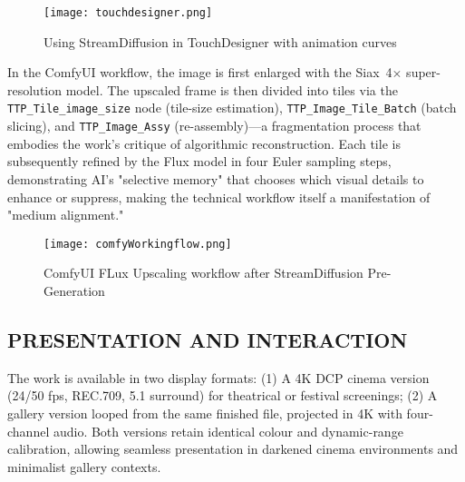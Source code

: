 \documentclass[sigconf]{acmart} %
\begin{document}
\begin{figure}[H]
    \centering
    \texttt{[image: touchdesigner.png]}
    \caption{Using StreamDiffusion in TouchDesigner with animation curves}
    \label{fig:enter-label}
\end{figure}

In the ComfyUI workflow, the image is first enlarged with the Siax~4$\times$ super-resolution model. The upscaled frame is then divided into tiles via the \texttt{TTP\_Tile\_image\_size} node (tile-size estimation), \texttt{TTP\_Image\_Tile\_Batch} (batch slicing), and \texttt{TTP\_Image\_Assy} (re-assembly)—a fragmentation process that embodies the work's critique of algorithmic reconstruction. Each tile is subsequently refined by the Flux model in four Euler sampling steps, demonstrating AI's "selective memory" that chooses which visual details to enhance or suppress, making the technical workflow itself a manifestation of "medium alignment."


\begin{figure}[H]
    \centering
    \texttt{[image: comfyWorkingflow.png]}
    \caption{ComfyUI FLux Upscaling workflow after StreamDiffusion Pre-Generation}
    \label{fig:enter-label}
\end{figure}


\subsection{PRESENTATION AND INTERACTION}
The work is available in two display formats:  
(1) A 4K DCP cinema version (24/50 fps, REC.709, 5.1 surround) for theatrical or festival screenings;  
(2) A gallery version looped from the same finished file, projected in 4K with four-channel audio. Both versions retain identical colour and dynamic-range calibration, allowing seamless presentation in darkened cinema environments and minimalist gallery contexts.

\end{document}
